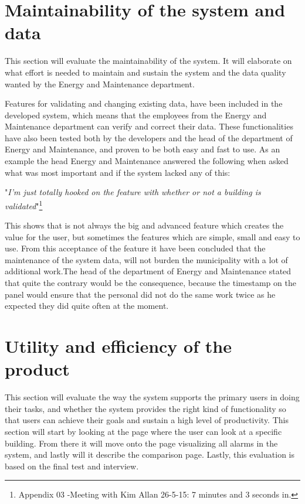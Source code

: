 \section*{Maintainability of the system and data}
This section will evaluate the maintainability of the system. It will elaborate on what effort is needed to maintain and sustain the system and the data quality wanted by the Energy and Maintenance department.   

Features for validating and changing existing data, have been included in the developed system, which means that the employees from the Energy and Maintenance department can verify and correct their data. These functionalities have also been tested both by the developers and the head of the department of Energy and Maintenance, and proven to be both easy and fast to use. As an example the head Energy and Maintenance answered the following when asked what was most important and if the system lacked any of this:
\begin{center}
"\emph{I’m just totally hooked on the feature with whether or not a building is validated}"\footnote{Appendix 03 -Meeting with Kim Allan 26-5-15: 7 minutes and 3 seconds in.}
\end{center}
This shows that is not always the big and advanced feature which creates the value for the user, but sometimes the features which are simple, small and easy to use. From this acceptance of the feature it have been concluded that the maintenance of the system data, will not burden the municipality with a lot of additional work.The head of the department of Energy and Maintenance stated that quite the contrary would be the consequence, because the timestamp on the panel would ensure that the personal did not do the same work twice as he expected they did quite often at the moment.
\section{Utility and efficiency of the product}
This section will evaluate the way the system supports the primary users in doing their tasks, and whether the system provides the right kind of functionality so that users can achieve their goals and sustain a high level of productivity. This section will start by looking at the page where the user can look at a specific building. From there it will move onto the page visualizing all alarms in the system, and lastly will it describe the comparison page. Lastly, this evaluation is based on the final test and interview.
